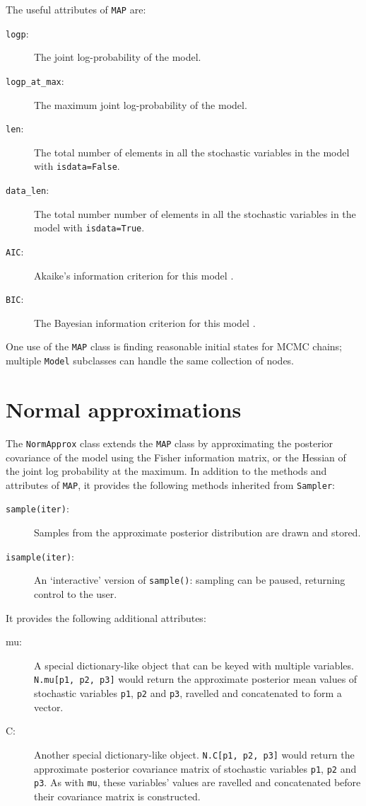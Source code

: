 The useful attributes of \texttt{MAP} are:
\begin{description}
    \item[\texttt{logp}:] The joint log-probability of the model.
    \item[\texttt{logp_at_max}:] The maximum joint log-probability of the model.
    \item[\texttt{len}:] The total number of elements in all the stochastic variables in the model with \texttt{isdata=False}.
    \item[\texttt{data_len}:] The total number number of elements in all the stochastic variables in the model with \texttt{isdata=True}.
    \item[\texttt{AIC}:] Akaike's information criterion for this model \cite{Akaike:1973aj,Burnham:2002ic}.
    \item[\texttt{BIC}:] The Bayesian information criterion for this model \cite{Schwarz:1978ud}.
\end{description}

One use of the \texttt{MAP} class is finding reasonable initial states for MCMC chains; multiple \texttt{Model} subclasses can handle the same collection of nodes.

\hypertarget{norm-approx}{}
\section*{Normal approximations} \label{sec:norm-approx}

The \texttt{NormApprox} class extends the \texttt{MAP} class by approximating the posterior covariance of the model using the Fisher information matrix, or the Hessian of the joint log probability at the maximum. In addition to the methods and attributes of \texttt{MAP}, it provides the following methods inherited from \texttt{Sampler}:
\begin{description}
    \item[\texttt{sample(iter)}:] Samples from the approximate posterior distribution are drawn and stored.
    \item[\texttt{isample(iter)}:] An `interactive' version of \texttt{sample()}: sampling can be paused, returning control to the user.
\end{description}
It provides the following additional attributes:
\begin{description}
    \item[mu:] A special dictionary-like object that can be keyed with multiple variables. \texttt{N.mu[p1, p2, p3]} would return the approximate posterior mean values of stochastic variables \texttt{p1}, \texttt{p2} and \texttt{p3}, ravelled and concatenated to form a vector.
    \item[C:] Another special dictionary-like object. \texttt{N.C[p1, p2, p3]} would return the approximate posterior covariance matrix of stochastic variables \texttt{p1}, \texttt{p2} and \texttt{p3}. As with \texttt{mu}, these variables' values are ravelled and concatenated before their covariance matrix is constructed.
\end{description}

